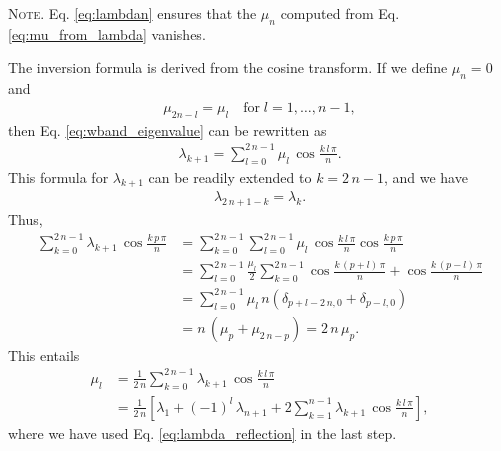 \documentclass[reprint, floatfix]{revtex4-1}
\newcommand{\note}[1]{{\color{DarkGreen}\footnotesize \textsc{Note.} #1}}
\begin{document}
\note{Eq. \eqref{eq:lambdan}
ensures that the $\mu_n$
computed from Eq. \eqref{eq:mu_from_lambda}
vanishes.

The inversion formula is derived from the cosine transform.
  If we define $\mu_n = 0$ and
  \begin{align}
    \mu_{ 2 n - l } = \mu_l
    \quad
    \mathrm{for\;} l = 1, \dots, n - 1,
    \label{eq:mu_reflection}
  \end{align}
  then Eq. \eqref{eq:wband_eigenvalue} can be rewritten as
  \begin{align}
    \lambda_{k+1}
    =
    \sum_{ l = 0 }^{ 2 \, n - 1 }
    \mu_l \, \cos \frac{ k \, l \, \pi } { n }.
    \label{eq:lambda_cosine_sum}
  \end{align}
  This formula for $\lambda_{k+1}$
  can be readily extended to $k = 2 \, n - 1$,
  and we have
  \begin{align}
    \lambda_{ 2 \, n + 1 - k } = \lambda_k.
    \label{eq:lambda_reflection}
  \end{align}
  Thus,
  $$
  \begin{aligned}
    \sum_{ k = 0 }^{ 2 \, n - 1 }
      \lambda_{ k + 1 } \,
      \cos \frac{ k \, p \, \pi }
                {      n        }
    &=
    \sum_{ k = 0 }^{ 2 \, n - 1 }
      \sum_{ l = 0 }^{ 2 \, n - 1 }
        \mu_l \,
        \cos \frac{ k \, l \, \pi }
                  {      n        }
        \cos \frac{ k \, p \, \pi }
                  {      n        }
    \\
    &=
    \sum_{ l = 0 }^{ 2 \, n - 1 }
      \frac{ \mu_l } { 2 }
      \sum_{ k = 0 }^{ 2 \, n - 1 }
        \cos \frac{ k \, (p + l) \, \pi }
                  {      n        }
                  +
        \cos \frac{ k \, (p - l) \, \pi }
                  {      n        }
    \\
    &=
    \sum_{ l = 0 }^{ 2 \, n - 1 }
      \mu_l \, n \left(
        \delta_{ p + l - 2 \, n, 0 }
        +
        \delta_{ p - l, 0 }
      \right)
    \\
    &=
    n \, \left( \mu_p + \mu_{ 2 \, n - p} \right)
    =
    2 \, n \, \mu_p.
  \end{aligned}
  $$
  This entails
  $$
  \begin{aligned}
    \mu_l
    &=
    \frac{    1   }
         { 2 \, n }
    \sum_{ k = 0 }^{ 2 \, n - 1 }
      \lambda_{ k + 1 } \,
      \cos \frac{ k \, l \, \pi }
                {      n        }
              \\
    &=
    \frac{    1   }
         { 2 \, n }
    \left[
      \lambda_1
      +
      (-1)^l \, \lambda_{n + 1}
      +
      2 \sum_{ k = 1 }^{ n - 1 }
        \lambda_{ k + 1 } \,
        \cos \frac{ k \, l \, \pi }
                  {      n        }
    \right],
  \end{aligned}
  $$
  where we have used Eq. \eqref{eq:lambda_reflection}
  in the last step.

}
\end{document}
